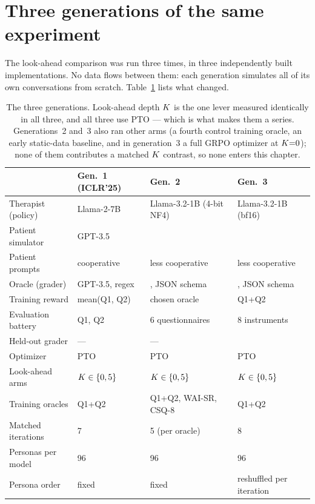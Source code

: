 \section{Three generations of the same experiment}
\label{sec:generations}

The look-ahead comparison was run three times, in three independently built
implementations. No data flows between them: each generation simulates all of its own
conversations from scratch. Table~\ref{tab:generations} lists what changed.

\begin{table}[t]
\centering\small
\setlength{\tabcolsep}{4pt}
\begin{tabular}{@{}llll@{}}
\toprule
 & \textbf{Gen.\ 1} (ICLR'25) & \textbf{Gen.\ 2} & \textbf{Gen.\ 3} \\
\midrule
Therapist (policy)   & Llama-2-7B         & Llama-3.2-1B (4-bit NF4) & Llama-3.2-1B (bf16) \\
Patient simulator    & GPT-3.5            & \primaryjudge{}          & \primaryjudge{} \\
Patient prompts      & cooperative        & less cooperative         & less cooperative \\
Oracle (grader)      & GPT-3.5, regex     & \primaryjudge{}, JSON schema & \primaryjudge{}, JSON schema \\
Training reward      & mean(Q1, Q2)       & chosen oracle            & Q1{+}Q2 \\
Evaluation battery   & Q1, Q2             & 6 questionnaires         & 8 instruments \\
Held-out grader      & ---                & ---                      & \heldout{} \\
Optimizer            & PTO                & PTO                      & PTO \\
Look-ahead arms      & $K \in \{0,5\}$   & $K \in \{0,5\}$         & $K \in \{0,5\}$ \\
Training oracles     & Q1{+}Q2            & Q1{+}Q2, WAI-SR, CSQ-8   & Q1{+}Q2 \\
Matched iterations   & 7                  & 5 (per oracle)           & 8 \\
Personas per model   & 96                 & 96                       & 96 \\
Persona order        & fixed              & fixed                    & reshuffled per iteration \\
\bottomrule
\end{tabular}
\caption{The three generations. Look-ahead depth $K$ is the one lever measured identically
in all three, and all three use PTO --- which is what makes them a series. Generations~2 and~3
also ran other arms (a fourth control training oracle, an early static-data baseline, and in
generation~3 a full GRPO optimizer at $K{=}0$); none of them contributes a matched $K$
contrast, so none enters this chapter.}
\label{tab:generations}
\end{table}


